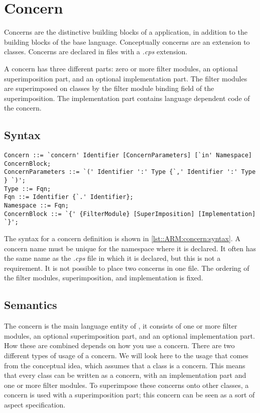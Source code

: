 \chapter{Concern} \label{chapter:concern}
Concerns are the distinctive building blocks of a \Compose* application, in addition to the building blocks of the base language. Conceptually concerns are an extension to classes.
Concerns are declared in files with a \emph{.cps} extension.

A concern has three different parts: zero or more filter modules, an optional superimposition part, and an optional implementation part. 
The filter modules are superimposed on classes by the filter module binding field of the superimposition. 
The implementation part contains language dependent code of the concern.

\section{Syntax}
\begin{lstlisting}[caption = {Concern syntax}, label = lst::ARM:concern:syntax, style = listing, language = ebnf, float = tpb]
Concern ::= `concern' Identifier [ConcernParameters] [`in' Namespace] ConcernBlock;
ConcernParameters ::= `(' Identifier ':' Type {`,' Identifier ':' Type } `)';
Type ::= Fqn;
Fqn ::= Identifier {`.' Identifier};
Namespace ::= Fqn;
ConcernBlock ::= `{' {FilterModule} [SuperImposition] [Implementation] `}';
\end{lstlisting}
The syntax for a concern definition is shown in \autoref{lst::ARM:concern:syntax}. 
A concern name must be unique for the namespace where it is declared.
It often has the same name as the \emph{.cps} file in which it is declared, but this is not a requirement.
It is not possible to place two concerns in one file.
The ordering of the filter modules, superimposition, and implementation is fixed.

\section{Semantics}
The concern is the main language entity of \Compose*, it consists of one or more filter modules, an optional superimposition part, and an optional implementation part. 
How these are combined depends on how you use a \Compose* concern. 
There are two different types of usage of a concern. 
We will look here to the usage that comes from the conceptual idea, which assumes that a class is a concern. 
This means that every class can be written as a concern, with an implementation part and one or more filter modules. 
To superimpose these concerns onto other classes, a concern is used with a superimposition part; this concern can be seen as a sort of aspect specification.

